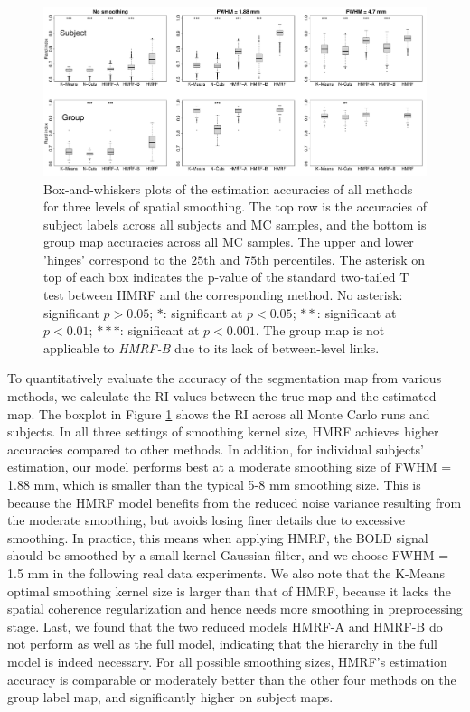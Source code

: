 \documentclass[review,authoryear]{elsarticle}
\begin{document}
\begin{figure}[htb]
  \centering
  \includegraphics[width=1.0\textwidth]{figures/syn/2level_3smoothing}
  \caption{Box-and-whiskers plots of the estimation accuracies of all methods
    for three levels of spatial smoothing. The top row is the accuracies of
    subject labels across all subjects and MC samples, and the bottom is group
    map accuracies across all MC samples. The upper and lower 'hinges'
    correspond to the $25$th and $75$th percentiles. The asterisk on top of each
    box indicates the p-value of the standard two-tailed T test between HMRF and
    the corresponding method. No asterisk: significant $p > 0.05$; $*$:
    significant at $p < 0.05$; $**$: significant at $p < 0.01$; ${***}$:
    significant at $p < 0.001$. The group map is not applicable to \emph{HMRF-B}
    due to its lack of between-level links.}
  \label{fig:synboxplot}
\end{figure}

To quantitatively evaluate the accuracy of the segmentation map from various
methods, we calculate the RI values between the true map and the estimated
map. The boxplot in Figure \ref{fig:synboxplot} shows the RI across all Monte
Carlo runs and subjects. In all three settings of smoothing kernel size, HMRF
achieves higher accuracies compared to other methods. In addition, for
individual subjects' estimation, our model performs best at a moderate smoothing
size of FWHM = 1.88 mm, which is smaller than the typical 5-8 mm smoothing
size. This is because the HMRF model benefits from the reduced noise variance
resulting from the moderate smoothing, but avoids losing finer details due to
excessive smoothing. In practice, this means when applying HMRF, the BOLD signal
should be smoothed by a small-kernel Gaussian filter, and we choose FWHM = 1.5
mm in the following real data experiments. We also note that the K-Means optimal
smoothing kernel size is larger than that of HMRF, because it lacks the spatial
coherence regularization and hence needs more smoothing in preprocessing
stage. Last, we found that the two reduced models HMRF-A and HMRF-B do not
perform as well as the full model, indicating that the hierarchy in the full
model is indeed necessary. For all possible smoothing sizes, HMRF's estimation
accuracy is comparable or moderately better than the other four methods on the
group label map, and significantly higher on subject maps.
\end{document}
